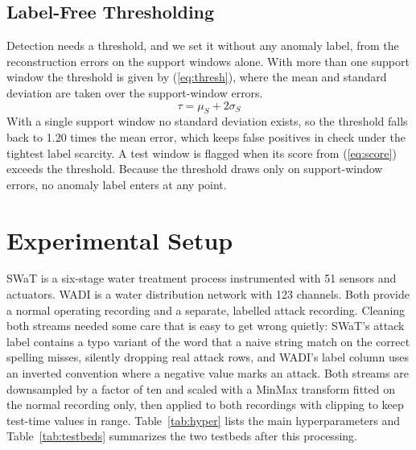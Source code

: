\documentclass[conference]{IEEEtran}
\begin{document}
\subsection{Label-Free Thresholding}

Detection needs a threshold, and we set it without any anomaly label, from
the reconstruction errors on the support windows alone. With more than one
support window the threshold is given by (\ref{eq:thresh}), where the mean
and standard deviation are taken over the support-window errors.
\begin{equation}
\tau = \mu_S + 2\sigma_S
\label{eq:thresh}
\end{equation}
With a single support window no standard deviation exists, so the threshold
falls back to 1.20 times the mean error, which keeps false positives in
check under the tightest label scarcity. A test window is flagged when its
score from (\ref{eq:score}) exceeds the threshold. Because the threshold
draws only on support-window errors, no anomaly label enters at any point.

\section{Experimental Setup}
\label{sec:setup}

SWaT is a six-stage water treatment process instrumented with 51 sensors and
actuators. WADI is a water distribution network with 123 channels. Both
provide a normal operating recording and a separate, labelled attack
recording. Cleaning both streams needed some care that is easy to get wrong
quietly: SWaT's attack label contains a typo variant of the word that a
naive string match on the correct spelling misses, silently dropping real
attack rows, and WADI's label column uses an inverted convention where a
negative value marks an attack. Both streams are downsampled by a factor of
ten and scaled with a MinMax transform fitted on the normal recording only,
then applied to both recordings with clipping to keep test-time values in
range. Table~\ref{tab:hyper} lists the main hyperparameters and
Table~\ref{tab:testbeds} summarizes the two testbeds after this processing.
\end{document}
